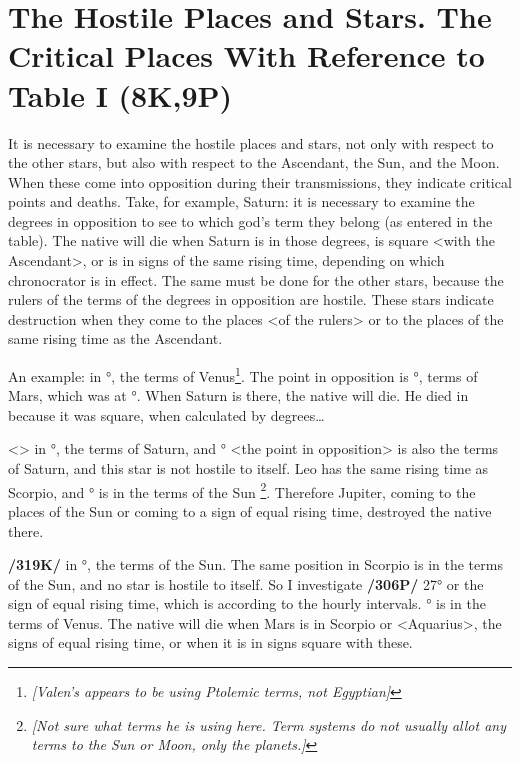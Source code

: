 \section{The Hostile Places and Stars. The Critical Places With Reference to Table I (8K,9P)}

It is necessary to examine the hostile places and stars, not only with respect to the other stars, but also with respect to the Ascendant, the Sun, and the Moon. When these come into opposition during their
transmissions, they indicate critical points and deaths. Take, for example, Saturn: it is necessary to examine the degrees in opposition to see to which god’s term they belong (as entered in the table). The
native will die when Saturn is in those degrees, is square <with the Ascendant>, or is in signs of the same rising time, depending on which chronocrator is in effect. The same must be done for the other stars, because the rulers of the terms of the degrees in opposition are hostile. These stars indicate destruction when they come to the places <of the rulers> or to the places of the same rising time as the Ascendant.

An example: \Saturn\xspace in \Cancer\xspace 21°, the terms of Venus\footnote{\textit{[Valen's appears to be using Ptolemic terms, not Egyptian]}}. The point in opposition is \Capricorn\xspace 21°, terms of Mars, which was at \Taurus\xspace 27°. When Saturn is there, the native will die. He died in \Virgo\xspace because it was square, when calculated by degrees…

<\Jupiter> in \Scorpio\xspace 14°, the terms of Saturn, and \Taurus\xspace 14° <the point in opposition> is also the terms of Saturn, and this star is not hostile to itself. Leo has the same rising time as Scorpio, and \Leo\xspace 14° is in the terms of the Sun \footnote{\textit{[Not sure what terms he is using here. Term systems do not usually allot any terms to the Sun or Moon, only the planets.]}}. Therefore Jupiter, coming to the places of the Sun or coming to a sign of equal rising time, destroyed the native there.

\textbf{/319K/} \Mars\xspace in \Taurus\xspace 27°, the terms of the Sun. The same position in Scorpio is in the terms of the
Sun, and \mndl no star is hostile to itself. So I investigate \Leo\xspace \textbf{/306P/} 27° or the sign of equal rising time, which is \Gemini\xspace according to the hourly intervals. \Gemini\xspace 27° is in the terms of Venus. The native will die when Mars is in Scorpio or <Aquarius>, the signs of equal rising time, or when it is in signs square with these. 

